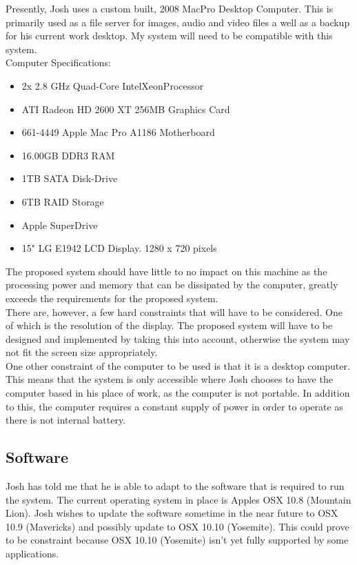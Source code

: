 Presently, Josh uses a custom built, 2008 MacPro Desktop Computer. This is primarily used as a file server for images, audio and video files a well as a backup for his current work desktop. My system will need to be compatible with this system.\\

\noindent Computer Specifications:
\begin{itemize}
    \item 2x 2.8 GHz Quad-Core Intel\textregistered Xeon\texttrademark Processor
    \item ATI Radeon HD 2600 XT 256MB Graphics Card
    \item 661-4449 Apple Mac Pro A1186 Motherboard
    \item 16.00GB DDR3 RAM
    \item 1TB SATA Disk-Drive
    \item 6TB RAID Storage
    \item Apple SuperDrive
    \item 15" LG E1942 LCD Display. 1280 x 720 pixels
\end{itemize}

\noindent The proposed system should have little to no impact on this machine as the processing power and memory that can be dissipated by the computer, greatly exceeds the requirements for the proposed system.\\

\noindent There are, however, a few hard constraints that will have to be considered. One of which is the resolution of the display. The proposed system will have to be designed and implemented by taking this into account, otherwise the system may not fit the screen size appropriately.\\

\noindent One other constraint of the computer to be used is that it is a desktop computer. This means that the system is only accessible where Josh chooses to have the computer based in his place of work, as the computer is not portable. In addition to this, the computer requires a constant supply of power in order to operate as there is not internal battery.\\

\subsection{Software}

Josh has told me that he is able to adapt to the software that is required to run the system. The current operating system in place is Apples OSX 10.8 (Mountain Lion). Josh wishes to update the software sometime in the near future to OSX 10.9 (Mavericks) and possibly update to OSX 10.10 (Yosemite). This could prove to be constraint because OSX 10.10 (Yosemite) isn't yet fully supported by some applications. 

